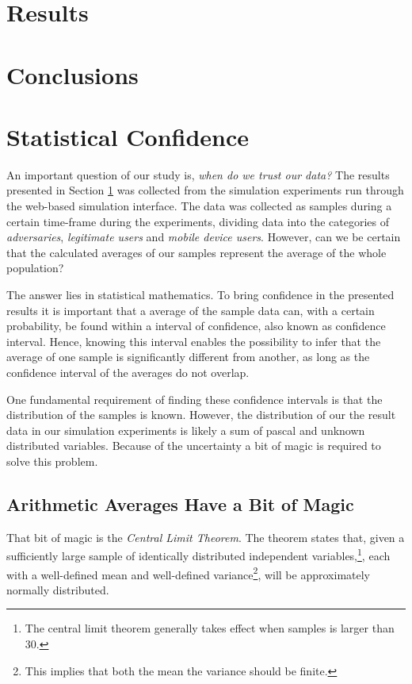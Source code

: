\documentclass[a4paper,11pt]{kth-mag}
\begin{document}
\section{Results}\label{result}

\section{Conclusions}
 

\appendix 
\appendixpage

 
\section{Statistical Confidence}\label{tab:confidence}
An important question of our study is, \emph{when do we trust our data?} The results presented in Section \ref{result} was collected from the simulation experiments run through the web-based simulation interface. The data was collected as samples during a certain time-frame during the experiments, dividing data into the categories of \emph{adversaries}, \emph{legitimate users} and \emph{mobile device users}. However,  can we be certain that the calculated averages of our samples represent the average of the whole population?

The answer lies in statistical mathematics. To bring confidence in the presented results it is important that a average of the sample data can, with a certain probability, be found within a interval of confidence, also known as confidence interval. Hence, knowing this interval enables the possibility to infer that the average of one sample is significantly different from another, as long as the confidence interval of the averages do not overlap.

One fundamental requirement of finding these confidence intervals is that the distribution of the samples is known. However, the distribution of our the result data in our simulation experiments is likely a sum of pascal and unknown distributed variables. Because of the uncertainty a bit of magic is required to solve this problem. 

\subsection{Arithmetic Averages Have a Bit of Magic}
That bit of magic is the \emph{Central Limit Theorem}. The theorem states that, given a sufficiently large sample of identically distributed independent variables,\footnote{The central limit theorem generally takes effect when samples is larger than 30.}, each with a well-defined mean and well-defined variance\footnote{This implies that both the mean the variance should be finite.}, will be approximately normally distributed\cite{gunnar}.
\end{document}
